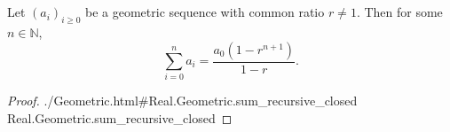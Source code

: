 \documentclass{article}
\newcommand{\lean}[1]{\leanref
  {./Geometric.html\#Real.Geometric.#1}
  {Real.Geometric.#1}}
\begin{document}
\section{}%
\label{sec:sum-geometric-series}

Let $(a_i)_{i \geq 0}$ be a geometric sequence with common ratio $r \neq 1$.
Then for some $n \in \mathbb{N}$,
$$\sum_{i=0}^n a_i = \frac{a_0(1 - r^{n+1})}{1 - r}.$$

\begin{proof}

  \lean{sum\_recursive\_closed}

\end{proof}
\end{document}
